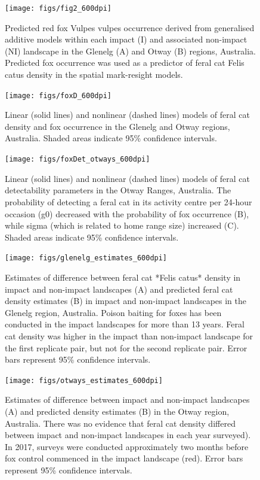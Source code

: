 \documentclass[]{elsarticle} %
\begin{document}
\newpage

\begin{figure}
\texttt{[image: figs/fig2\_600dpi]} \caption{Predicted red fox Vulpes vulpes occurrence derived from generalised additive models within each impact (I) and associated non-impact (NI) landscape in the Glenelg (A) and Otway (B) regions, Australia. Predicted fox occurrence was used as a predictor of feral cat Felis catus density in the spatial mark-resight models.}\label{fig:foxplot}
\end{figure}

\newpage

\begin{figure}
\texttt{[image: figs/foxD\_600dpi]} \caption{Linear (solid lines) and nonlinear (dashed lines) models of feral cat density and fox occurrence in the Glenelg and Otway regions, Australia. Shaded areas indicate 95\% confidence intervals.}\label{fig:dcor}
\end{figure}

\newpage

\begin{figure}
\texttt{[image: figs/foxDet\_otways\_600dpi]} \caption{Linear (solid lines) and nonlinear (dashed lines) models of feral cat detectability parameters in the Otway Ranges, Australia. The probability of detecting a feral cat in its activity centre per 24-hour occasion (g0) decreased with the probability of fox occurrence (B), while sigma (which is related to home range size) increased (C). Shaded areas indicate 95\% confidence intervals.}\label{fig:detcor}
\end{figure}

\newpage

\begin{figure}
\texttt{[image: figs/glenelg\_estimates\_600dpi]} \caption{Estimates of difference between feral cat *Felis catus* density in impact and non-impact landscapes (A) and predicted feral cat density estimates (B) in impact and non-impact landscapes in the Glenelg region, Australia. Poison baiting for foxes has been conducted in the impact landscapes for more than 13 years. Feral cat density was higher in the impact than non-impact landscape for the first replicate pair, but not for the second replicate pair. Error bars represent 95\% confidence intervals.}\label{fig:diffg}
\end{figure}

\newpage

\begin{figure}
\texttt{[image: figs/otways\_estimates\_600dpi]} \caption{Estimates of difference between impact and non-impact landscapes (A) and predicted density estimates (B) in the Otway region, Australia. There was no evidence that feral cat density differed between impact and non-impact landscapes in each year surveyed). In 2017, surveys were conducted approximately two months before fox control commenced in the impact landscape (red). Error bars represent 95\% confidence intervals.}\label{fig:diffo}
\end{figure}
\end{document}

